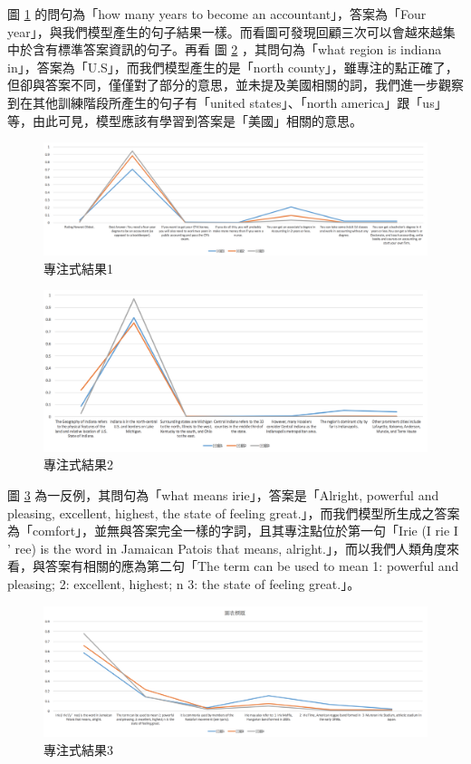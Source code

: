 圖 \ref{fig:attn_1} 的問句為「how many years to become an accountant」，答案為「Four year」，與我們模型產生的句子結果一樣。而看圖可發現回顧三次可以會越來越集中於含有標準答案資訊的句子。再看
圖 \ref{fig:attn_2} ，其問句為「what region is indiana in」，答案為「U.S」，而我們模型產生的是「north county」，雖專注的點正確了，但卻與答案不同，僅僅對了部分的意思，並未提及美國相關的詞，我們進一步觀察到在其他訓練階段所產生的句子有「united states」、「north america」跟「us」等，由此可見，模型應該有學習到答案是「美國」相關的意思。
\begin{figure}
    \centering
    \includegraphics[scale=0.55,angle=90]{images/chap3_attn1.png}
    \caption{專注式結果1}\label{fig:attn_1}
\end{figure}
\begin{figure}
    \centering
    \includegraphics[scale=0.58,angle=90]{images/chap3_attn2.png}
    \caption{專注式結果2}\label{fig:attn_2}
\end{figure}

圖 \ref{fig:attn_3} 為一反例，其問句為「what means irie」，答案是「Alright, powerful and pleasing, excellent, highest, the state of feeling great.」，而我們模型所生成之答案為「comfort」，並無與答案完全一樣的字詞，且其專注點位於第一句「Irie (I rie I '  ree) is the word in Jamaican Patois that means, alright.」，而以我們人類角度來看，與答案有相關的應為第二句「The term can be used to mean 1: powerful and pleasing; 2: excellent, highest; n 3: the state of feeling great.」。
\begin{figure}
    \centering
    \includegraphics[scale=0.55,angle=90]{images/chap3_attn4.png}
    \caption{專注式結果3}\label{fig:attn_3}
\end{figure}

